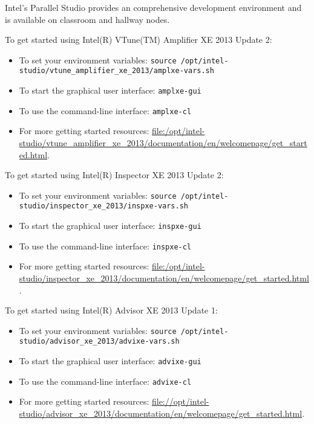 \documentclass[12pt,a4paper]{article}
\begin{document}
Intel's Parallel Studio provides an comprehensive development environment and is available on classroom and hallway nodes.

To get started using Intel(R) VTune(TM) Amplifier XE 2013 Update 2:
\begin{itemize}
    \item To set your environment variables: \texttt{source /opt/intel-studio/vtune\_amplifier\_xe\_2013/amplxe-vars.sh}
    \item To start the graphical user interface: \texttt{amplxe-gui}
    \item To use the command-line interface: \texttt{amplxe-cl}
    \item For more getting started resources: \url{file:/opt/intel-studio/vtune_amplifier_xe_2013/documentation/en/welcomepage/get_started.html}.
\end{itemize}

To get started using Intel(R) Inspector XE 2013 Update 2:
\begin{itemize}
    \item To set your environment variables: \texttt{source /opt/intel-studio/inspector\_xe\_2013/inspxe-vars.sh}
    \item To start the graphical user interface: \texttt{inspxe-gui}
    \item To use the command-line interface: \texttt{inspxe-cl}
    \item For more getting started resources: \url{file:/opt/intel-studio/inspector_xe_2013/documentation/en/welcomepage/get_started.html}.
\end{itemize}

To get started using Intel(R) Advisor XE 2013 Update 1:
\begin{itemize}
    \item To set your environment variables: \texttt{source /opt/intel-studio/advisor\_xe\_2013/advixe-vars.sh}
    \item To start the graphical user interface: \texttt{advixe-gui}
    \item To use the command-line interface: \texttt{advixe-cl}
    \item For more getting started resources: \url{file://opt/intel-studio/advisor_xe_2013/documentation/en/welcomepage/get_started.html}.
\end{itemize}
\end{document}
